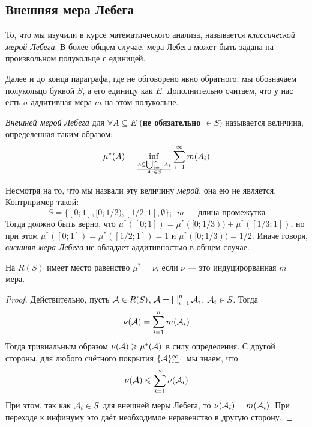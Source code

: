 \subsection{Внешняя мера Лебега}

\begin{note}
	То, что мы изучили в курсе математического анализа, называется \textit{классической мерой Лебега}. В более общем случае, мера Лебега может быть задана на произвольном полукольце с единицей.
\end{note}

\begin{note}
	Далее и до конца параграфа, где не обговорено явно обратного, мы обозначаем полукольцо буквой $S$, а его единицу как $E$. Дополнительно считаем, что у нас есть $\sigma$-аддитивная мера $m$ на этом полукольце.
\end{note}

\begin{definition}
	\textit{Внешней мерой Лебега} для $\forall A \subseteq E$ (\textbf{не обязательно $\in S$}) называется величина, определенная таким образом:
	\[
		\mu^*(A) = \inf_{A \subseteq \bigcup_{i = 1}^\infty A_i \over A_i \in S} \sum_{i = 1}^\infty m(A_i)
	\]
\end{definition}

\begin{note}
	Несмотря на то, что мы назвали эту величину \textit{мерой}, она ею не является. Контрпример такой:
	\[
		S = \{[0; 1], [0; 1/2), [1/2; 1], \emptyset\};\ \ m \text{ --- длина промежутка}
	\]
	Тогда должно быть верно, что $\mu^*([0; 1]) = \mu^*([0; 1/3)) + \mu^*([1/3; 1])$, но при этом $\mu^*([0; 1]) = \mu^*([1/2; 1]) = 1$ и $\mu^*([0; 1/3)) = 1/2$. Иначе говоря, \textit{внешняя мера Лебега} не обладает аддитивностью в общем случае.
\end{note}

\begin{proposition}
	На $R(S)$ имеет место равенство $\mu^* = \nu$, если $\nu$ --- это индуцирорванная $m$ мера.
\end{proposition}

\begin{proof}
	Действительно, пусть $\mathcal{A} \in R(S)$, $\mathcal{A} = \bigsqcup_{i = 1}^n \mathcal{A}_i$, $\mathcal{A}_i \in S$. Тогда
	\[
		\nu(\mathcal{A}) = \sum_{i = 1}^n m(\mathcal{A}_i)
	\]
	Тогда тривиальным образом $\nu(\mathcal{A}) \geqslant \mu^*(\mathcal{A})$ в силу определения. С другой стороны, для любого счётного покрытия $\{\mathcal{A}\}_{i = 1}^\infty$ мы знаем, что
	\[
		\nu(\mathcal{A}) \leqslant \sum_{i = 1}^\infty \nu(\mathcal{A}_i)
	\]
	При этом, так как $\mathcal{A}_i \in S$ для внешней меры Лебега, то $\nu(\mathcal{A}_i) = m(\mathcal{A}_i)$. При переходе к инфинуму это даёт необходимое неравенство в другую сторону.
\end{proof}

